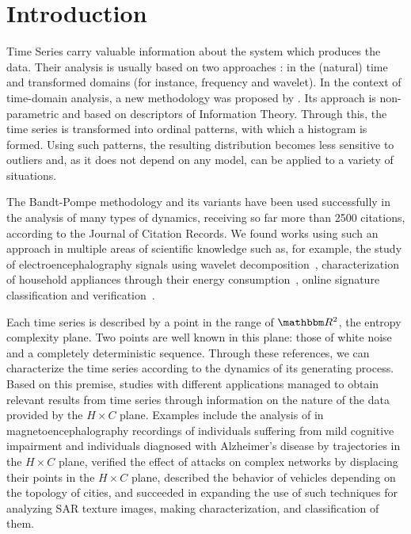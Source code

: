 \section{Introduction}\label{Sec:Intro}

Time Series carry valuable information about the system which produces the data.
Their analysis is usually based on two approaches \cite{TimeSeriesAnalysisCryerChan}: in the (natural) time and transformed domains (for instance, frequency and wavelet).
In the context of time-domain analysis, a new methodology was proposed by .
Its approach is non-parametric and based on descriptors of Information Theory.
Through this, the time series is transformed into ordinal patterns, with which a histogram is formed.
Using such patterns, the resulting distribution becomes less sensitive to outliers and, as it does not depend on any model, can be applied to a variety of situations.

The Bandt-Pompe methodology and its variants have been used successfully in the analysis of many types of dynamics, receiving so far more than \num{2500} citations, according to the Journal of Citation Records.
We found works using such an approach in multiple areas of scientific knowledge such as, for example,
the study of electroencephalography signals using wavelet decomposition~\cite{EEGAnalysisWaveletInformationTools},
characterization of household appliances through their energy consumption~\cite{CharacterizationElectricLoadInformationTheoryQuantifiers},
 online signature classification and verification~\cite{ClassificationVerificationOnlineHandwrittenSignatures}.

Each time series is described by a point in the range of $\mathbbm R^2$, the entropy complexity plane.
Two points are well known in this plane: those of white noise and a completely deterministic sequence.
Through these references, we can characterize the time series according to the dynamics of its generating process.
Based on this premise, studies with different applications managed to obtain relevant results from time series through information on the nature of the data provided by the $H \times C$ plane.
Examples include the analysis of  in magnetoencephalography recordings of individuals suffering from mild cognitive impairment and individuals diagnosed with Alzheimer's disease by trajectories in the $H \times C$ plane,
 verified the effect of attacks on complex networks by displacing their points in the $H \times C$ plane,
 described the behavior of vehicles depending on the topology of cities, and
 succeeded in expanding the use of such techniques for analyzing SAR texture images, making characterization, and classification of them.


